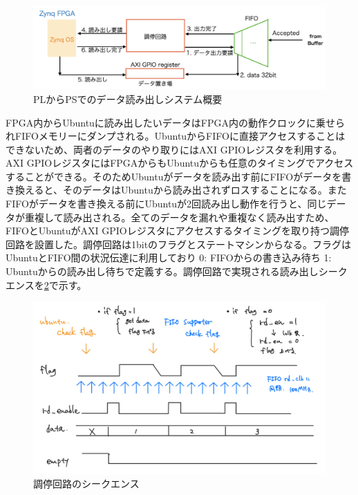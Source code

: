 \begin{figure} 
\centering
\includegraphics[width=16cm]{fig/QAQC/JATHubarbitator.png}
\caption[PLからPSでのデータ読み出しシステム概要]{PLからPSでのデータ読み出しシステム概要}
\label{JATHubarbitor}
\end{figure}

FPGA内からUbuntuに読み出したいデータはFPGA内の動作クロックに乗せられFIFOメモリーにダンプされる。UbuntuからFIFOに直接アクセスすることはできないため、両者のデータのやり取りにはAXI GPIOレジスタを利用する。
AXI GPIOレジスタにはFPGAからもUbuntuからも任意のタイミングでアクセスすることができる。そのためUbuntuがデータを読み出す前にFIFOがデータを書き換えると、そのデータはUbuntuから読み出されずロスすることになる。またFIFOがデータを書き換える前にUbuntuが2回読み出し動作を行うと、同じデータが重複して読み出される。全てのデータを漏れや重複なく読み出すため、FIFOとUbuntuがAXI GPIOレジスタにアクセスするタイミングを取り持つ調停回路を設置した。調停回路は1bitのフラグとステートマシンからなる。フラグはUbuntuとFIFO間の状況伝達に利用しており 0: FIFOからの書き込み待ち 1: Ubuntuからの読み出し待ちで定義する。調停回路で実現される読み出しシークエンスを\ref{JATHubarbitation}で示す。
\begin{figure} 
\centering
\includegraphics[width=16cm]{fig/QAQC/JATHubarbitation.png}
\caption[調停回路のシークエンス]{調停回路のシークエンス}
\label{JATHubarbitation}
\end{figure}

